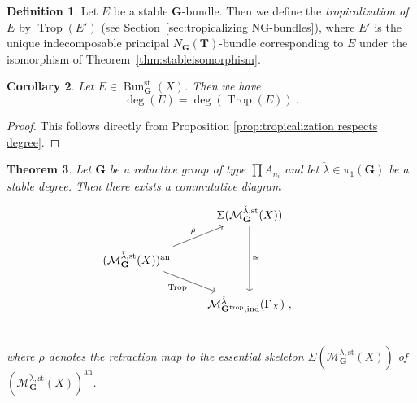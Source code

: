 \documentclass[10pt, a4paper]{amsart}
\newtheorem{theorem}{Theorem}[section]
\newtheorem{corollary}[theorem]{Corollary}
\theoremstyle{definition}
\newtheorem{definition}[theorem]{Definition}
\theoremstyle{myitemstyle}
\newcommand{\lambdacheck}{\check{\lambda}}
\newcommand{\bfG}{\mathbf{G}}
\newcommand{\bfT}{\mathbf{T}}
\newcommand{\mc}[1]{{\mathcal{#1}}}
\DeclareMathOperator{\Trop}{Trop}
\DeclareMathOperator{\Bun}{Bun}
\newcommand{\an}{\mathrm{an}}
\newcommand{\st}{\mathrm{st}}
\newcommand{\ind}{\mathrm{ind}}
\newcommand{\trop}{{\mathrm{trop}}}
\begin{document}
\begin{definition}
Let $E$ be a stable $\mathbf{G}$-bundle. Then we define the \emph{tropicalization of $E$} by $\Trop(E')$ (see Section~\ref{sec:tropicalizing NG-bundles}), where $E'$ is the unique indecomposable principal $N_\bfG(\bfT)$-bundle corresponding to $E$ under the isomorphism of Theorem~\ref{thm:stableisomorphism}.
\label{def:stabletropicalization}
\end{definition}

\begin{corollary}
    Let $E\in \Bun_{\mathbf{G}}^{\st}(X)$. Then we have
    \[
    \deg(E)=\deg(\Trop(E)) \ .
    \]
\end{corollary}

\begin{proof}
    This follows directly from Proposition \ref{prop:tropicalization respects degree}.
\end{proof}



\begin{theorem}
\label{thm:tropical stable bundles skeleton of stable bundles}
Let $\mathbf{G}$ be a reductive group of type $\prod A_{n_i}$ and let $\lambdacheck\in \pi_1(\mathbf{G})$ be a stable degree. Then there exists a commutative diagram
\[
\begin{tikzcd}
    & 
        \Sigma(\mc M_{\bfG}^{\lambdacheck,\st}(X))\arrow[dd,"\cong"] \\
    (\mc M_{\bfG}^{\lambdacheck,\st}(X))^\an \arrow[ur,"\rho"]\arrow[dr,"\Trop"']&
        & \\
    &
        \mc M^{\lambdacheck}_{\bfG^\trop,\ind}(\Gamma_X) \ ,\\
\end{tikzcd}
\]
where $\rho$ denotes the retraction map to the essential skeleton $\Sigma(\mc M_{\mathbf{G}}^{\lambdacheck,\st}(X))$ of $(\mc M_{\mathbf{G}}^{\lambdacheck,\st}(X))^\an$. 
\end{theorem}
\end{document}
